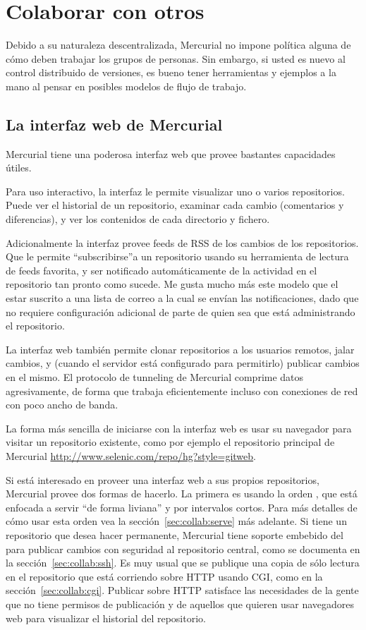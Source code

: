 \chapter{Colaborar con otros}
\label{cha:collab}

Debido a su naturaleza descentralizada, Mercurial no impone política
alguna de cómo deben trabajar los grupos de personas. Sin embargo, si
usted es nuevo al control distribuido de versiones, es bueno tener
herramientas y ejemplos a la mano al pensar en posibles modelos de
flujo de trabajo.

\section{La interfaz web de Mercurial}

Mercurial tiene una poderosa interfaz web que provee bastantes
capacidades útiles.

Para uso interactivo, la interfaz le permite visualizar uno o varios
repositorios. Puede ver el historial de un repositorio, examinar cada
cambio (comentarios y diferencias), y ver los contenidos de cada
directorio y fichero.

Adicionalmente la interfaz provee feeds de RSS de los cambios de los
repositorios. Que le permite ``subscribirse''a un repositorio usando
su herramienta de lectura de feeds favorita, y ser notificado
automáticamente de la actividad en el repositorio tan pronto como
sucede. Me gusta mucho más este modelo que el estar suscrito a una
lista de correo a la cual se envían las notificaciones, dado que no
requiere configuración adicional de parte de quien sea que está
administrando el repositorio.

La interfaz web también permite clonar repositorios a los usuarios
remotos, jalar cambios, y (cuando el servidor está configurado para
permitirlo) publicar cambios en el mismo.  El protocolo de tunneling
de Mercurial comprime datos agresivamente, de forma que trabaja
eficientemente incluso con conexiones de red con poco ancho de banda.

La forma más sencilla de iniciarse con la interfaz web es usar su
navegador para visitar un repositorio existente, como por ejemplo el
repositorio principal de Mercurial \url{http://www.selenic.com/repo/hg?style=gitweb}.

Si está interesado en proveer una interfaz web a sus propios
repositorios, Mercurial provee dos formas de hacerlo.  La primera es
usando la orden , que está enfocada a servir ``de forma
liviana'' y por intervalos cortos.  Para más detalles de cómo usar
esta orden vea la sección~\ref{sec:collab:serve} más adelante. Si
tiene un repositorio que desea hacer permanente, Mercurial tiene
soporte embebido del  para publicar cambios con seguridad
al repositorio central, como se documenta en la
sección~\ref{sec:collab:ssh}.  Es muy usual que se publique una copia
de sólo lectura en el repositorio que está corriendo sobre HTTP usando
CGI, como en la sección~\ref{sec:collab:cgi}.  Publicar sobre HTTP
satisface las necesidades de la gente que no tiene permisos de
publicación y de aquellos que quieren usar navegadores web para
visualizar el historial del repositorio.

